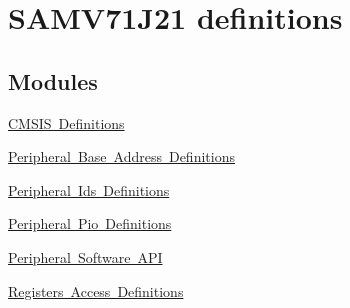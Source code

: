 \hypertarget{group__SAMV71J21__definitions}{}\section{S\+A\+M\+V71\+J21 definitions}
\label{group__SAMV71J21__definitions}
\subsection*{Modules}
\begin{DoxyCompactItemize}
\item 
\mbox{\hyperlink{group__SAMV71J21__cmsis}{C\+M\+S\+I\+S Definitions}}
\item 
\mbox{\hyperlink{group__SAMV71J21__base}{Peripheral Base Address Definitions}}
\item 
\mbox{\hyperlink{group__SAMV71J21__id}{Peripheral Ids Definitions}}
\item 
\mbox{\hyperlink{group__SAMV71J21__pio}{Peripheral Pio Definitions}}
\item 
\mbox{\hyperlink{group__SAMV71J21__api}{Peripheral Software A\+PI}}
\item 
\mbox{\hyperlink{group__SAMV71J21__reg}{Registers Access Definitions}}
\end{DoxyCompactItemize}
